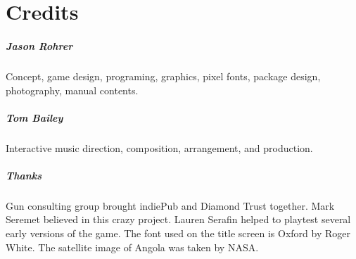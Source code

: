 \documentclass[8pt]{extbook}
\begin{document}



\part{Credits}
\addtocounter{chapter}{1}
\setcounter{section}{0}

\subsubsection{Jason Rohrer}
Concept, game design, programing, graphics, pixel fonts, package design, photography, manual contents.

\subsubsection{Tom Bailey}
Interactive music direction, composition, arrangement, and production.

\subsubsection{Thanks}
Gun consulting group brought indiePub and Diamond Trust together.  Mark Seremet believed in this crazy project.  Lauren Serafin helped to playtest several early versions of the game.  The font used on the title screen is Oxford by Roger White.  The satellite image of Angola was taken by NASA.
\end{document}
